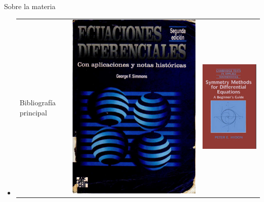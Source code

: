 \documentclass[handout,hyperref={colorlinks=true}]{beamer}
\begin{document}
\begin{frame}{Sobre la materia}
\begin{itemize}
 \item  \begin{tabular}{m{4cm} m{2cm} m{2cm}} Bibliografía principal & \includegraphics[scale=0.05]{imagenes/Tapa_Simmons.jpg} &    \includegraphics[scale=0.13]{imagenes/tapa_hydon.png}          \end{tabular} 


\end{itemize}
\end{frame}
\end{document}
